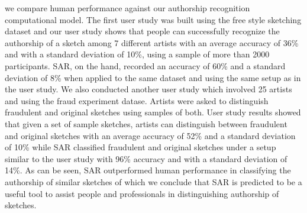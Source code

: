 we compare human performance against our authorship recognition computational model. The first user study was built using the free style sketching dataset and our user study shows that people can successfully recognize the authorship of a sketch among 7 different artists with an average accuracy of 36\% and with a standard deviation of 10\%, using a sample of more than 2000 participants. SAR, on the hand, recorded an accuracy of 60\% and a standard deviation of 8\% when applied to the same dataset and using the same setup as in the user study. We also conducted another user study which involved 25 artists and using the fraud experiment datase. Artists were asked to distinguish fraudulent and original sketches using samples of both. User study results showed that given a set of sample sketches, artists can distinguish between fraudulent and original sketches with an average accuracy of 52\% and a standard deviation of 10\% while SAR classified fraudulent and original sketches under a setup similar to the user study with 96\% accuracy and with a standard deviation of 14\%. As can be seen, SAR outperformed human performance in classifying the authorship of similar sketches of which we conclude that SAR is predicted to be a useful tool to assist people and professionals in distinguishing authorship of sketches.
\fi

